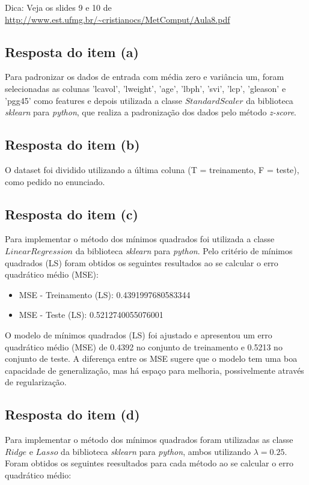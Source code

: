 Dica: Veja os slides 9 e 10 de \url{http://www.est.ufmg.br/~cristianocs/MetComput/Aula8.pdf}

\subsection{Resposta do item (a)}
Para padronizar os dados de entrada com média zero e variância um, foram selecionadas as colunas 'lcavol', 'lweight', 'age', 'lbph', 'svi', 'lcp', 'gleason' e 'pgg45' como features e depois utilizada a classe $StandardScaler$ da biblioteca  \textit{sklearn} para \textit{python}, que realiza a padronização dos dados pelo método \textit{z-score}.

\subsection{Resposta do item (b)}
O dataset foi dividido utilizando a última coluna (T = treinamento, F = teste), como pedido no enunciado.

\subsection{Resposta do item (c)}
Para implementar o método dos mínimos quadrados foi utilizada a classe $LinearRegression$ da biblioteca  \textit{sklearn} para \textit{python}.
Pelo critério de mínimos quadrados (LS) foram obtidos os seguintes resultados ao se calcular o erro quadrático médio (MSE):

\begin{itemize}
    \item MSE - Treinamento (LS): 0.4391997680583344
    \item  MSE - Teste (LS): 0.5212740055076001
\end{itemize}

O modelo de mínimos quadrados (LS) foi ajustado e apresentou um erro quadrático médio (MSE) de 0.4392 no conjunto de treinamento e 0.5213 no conjunto de teste. A diferença entre os MSE sugere que o modelo tem uma boa capacidade de generalização, mas há espaço para melhoria, possivelmente através de regularização.


\subsection{Resposta do item (d)}
Para implementar o método dos mínimos quadrados foram utilizadas as classe $Ridge$ e $Lasso$ da biblioteca \textit{sklearn} para \textit{python}, ambos utilizando $\lambda=0.25$.
Foram obtidos os seguintes reesultados para cada método ao se calcular o erro quadrático médio:

